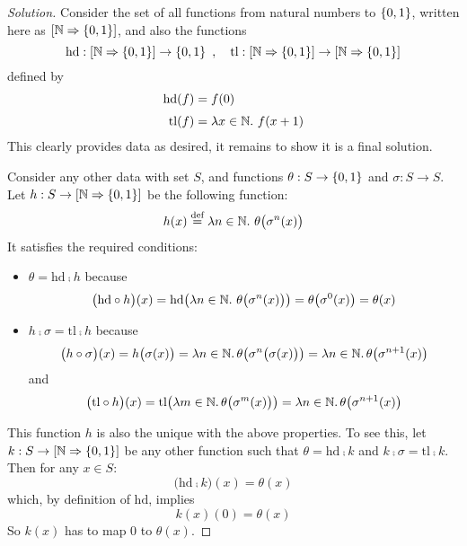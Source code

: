 \begin{proof}[Solution]
    Consider the set of all functions from natural numbers to $\{ 0,1 \}$,
    written here as ${[\mathbb{N}\Rightarrow\{ 0,1 \}]}$, and also the
    functions
    \[
      \mathrm{hd}: [\mathbb{N}\Rightarrow\{ 0,1 \}] \to \{ 0,1 \}
      \enspace,\quad
      \mathrm{tl}
      : [\mathbb{N}\Rightarrow\{ 0,1 \}] \to [\mathbb{N}\Rightarrow\{ 0,1 \}]
    \]
    defined by
    \begin{align*}
      \mathrm{hd} (f) &= f(0)
      \\[1mm]
      \mathrm{tl} (f) &= \lambda x \in \mathbb{N}.\ f (x + 1)
    \end{align*}
    This clearly provides data as desired, it remains to show it is a final
    solution.

    Consider any other data with set $S$, and functions
    $\theta: S \to \{ 0, 1 \}$ and $\sigma: S \to S$.
    Let ${h: S \to [\mathbb{N}\Rightarrow\{ 0,1 \}]}$ be the following function:
    \[ h (x) \eqdef \lambda n \in \nats.\ \theta\big(\sigma^n (x)\big) \]
    It satisfies the required conditions:

    \begin{itemize}

    \item
    $\theta = \mathrm{hd} \comp h$ because
    \[
      \big(\mathrm{hd} \circ h\big)(x)
      = \mathrm{hd}
          \big( \lambda n \in \mathbb{N}.\ \theta\big(\sigma^n(x)\big) \big)
      = \theta\big(\sigma^0(x)\big)
      = \theta(x)
    \]

    \item
    $h \comp \sigma = \mathrm{tl} \comp h$ because
    \[
      \big(h \circ \sigma\big)(x)
      = h \big( \sigma (x) \big)
      = \lambda n \in \mathbb{N}.  \, \theta\big(\sigma^n\big(\sigma(x)\big)\big)
      = \lambda n \in \mathbb{N}.  \, \theta\big(\sigma^{n+1}(x)\big)
    \]
    and
    \[
      \big(\mathrm{tl} \circ h\big)(x)
      = \mathrm{tl}
          \big(\lambda m \in \mathbb{N}.\, \theta\big(\sigma^m (x)\big)\big)
      = \lambda n \in \mathbb{N}.\, \theta\big(\sigma^{n+1} (x)\big)
    \]

    \end{itemize}

    This function $h$ is also the unique with the above properties. To see
    this, let $k: S\to[\mathbb{N}\Rightarrow\{ 0,1 \}]$ be any other function
    such that $\theta = \mathrm{hd} \comp k$ and
    $k \comp \sigma = \mathrm{tl} \comp k$.
    Then for any $x \in S$:
    \[
      \big(\mathrm{hd} \comp k\big) (x) =  \theta(x)
    \]
    which, by definition of $\mathrm{hd}$, implies
    \[ k(x)(0) = \theta(x) \]
    So $k(x)$ has to map $0$ to $\theta(x)$.


\end{proof}
